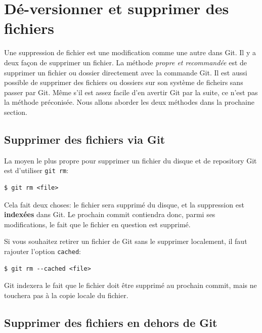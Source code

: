 \documentclass{../../common/tufte-latex/tufte-handout}
\begin{document}
\section{Dé-versionner et supprimer des fichiers}

Une suppression de fichier est une modification comme une autre dans Git.
Il y a deux façon de supprimer un fichier.
La méthode \textit{propre et recommandée} est de supprimer un fichier ou dossier directement avec la commande Git.
Il est aussi possible de supprimer des fichiers ou dossiers sur son système de ficheirs sans passer par Git.
Même s'il est assez facile d'en avertir Git par la suite, ce n'est pas la méthode préconisée.
Nous allons aborder les deux méthodes dans la prochaine section.

\subsection{Supprimer des fichiers via Git}

La moyen le plus propre pour supprimer un fichier du disque et de repository Git est d'utiliser \texttt{git rm}:

\begin{lstlisting}[style=BashInputStyle]
  $ git rm <file>
\end{lstlisting}

Cela fait deux choses: le fichier sera supprimé du disque, et la suppression est \textbf{indexées} dans Git.
Le prochain commit contiendra donc, parmi ses modifications, le fait que le fichier en question est supprimé.

Si vous souhaitez retirer un fichier de Git sans le supprimer localement, il faut rajouter l'option \texttt{cached}:

\begin{lstlisting}[style=BashInputStyle]
  $ git rm --cached <file>
\end{lstlisting}

Git indexera le fait que le fichier doit être supprimé au prochain commit, mais ne touchera pas à la copie locale du fichier.

\subsection{Supprimer des fichiers en dehors de Git}
\end{document}
